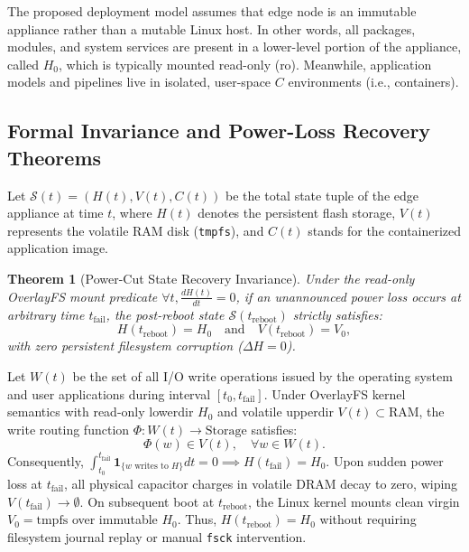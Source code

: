 \documentclass[conference]{IEEEtran}
\newtheorem{theorem}{Theorem}
\begin{document}
The proposed deployment model assumes that edge node is an immutable appliance rather than a mutable Linux host. In other words, all packages, modules, and system services are present in a lower-level portion of the appliance, called $H_0$, which is typically mounted read-only (ro). Meanwhile, application models and pipelines live in isolated, user-space $C$ environments (i.e., containers).

\subsection{Formal Invariance and Power-Loss Recovery Theorems}
Let $\mathcal{S}(t) = (H(t), V(t), C(t))$ be the total state tuple of the edge appliance at time $t$, where $H(t)$ denotes the persistent flash storage, $V(t)$ represents the volatile RAM disk (\texttt{tmpfs}), and $C(t)$ stands for the containerized application image.

\begin{theorem}[Power-Cut State Recovery Invariance]
Under the read-only OverlayFS mount predicate $\forall t, \frac{d H(t)}{dt} = 0$, if an unannounced power loss occurs at arbitrary time $t_{\mathrm{fail}}$, the post-reboot state $\mathcal{S}(t_{\mathrm{reboot}})$ strictly satisfies:
\begin{equation}
H(t_{\mathrm{reboot}}) = H_0 \quad \text{and} \quad V(t_{\mathrm{reboot}}) = V_0,
\label{eq:power_invariance}
\end{equation}
with zero persistent filesystem corruption ($\Delta H = 0$).
\end{theorem}

\begin{IEEEproof}
Let $W(t)$ be the set of all I/O write operations issued by the operating system and user applications during interval $[t_0, t_{\mathrm{fail}}]$. Under OverlayFS kernel semantics with read-only lowerdir $H_0$ and volatile upperdir $V(t) \subset \text{RAM}$, the write routing function $\Phi: W(t) \to \text{Storage}$ satisfies:
\begin{equation}
\Phi(w) \in V(t), \quad \forall w \in W(t).
\end{equation}
Consequently, $\int_{t_0}^{t_{\mathrm{fail}}} \mathbf{1}_{\{w \text{ writes to } H\}} dt = 0 \implies H(t_{\mathrm{fail}}) = H_0$. Upon sudden power loss at $t_{\mathrm{fail}}$, all physical capacitor charges in volatile DRAM decay to zero, wiping $V(t_{\mathrm{fail}}) \to \emptyset$. On subsequent boot at $t_{\mathrm{reboot}}$, the Linux kernel mounts clean virgin $V_0 = \text{tmpfs}$ over immutable $H_0$. Thus, $H(t_{\mathrm{reboot}}) = H_0$ without requiring filesystem journal replay or manual \texttt{fsck} intervention.
\end{IEEEproof}
\end{document}
